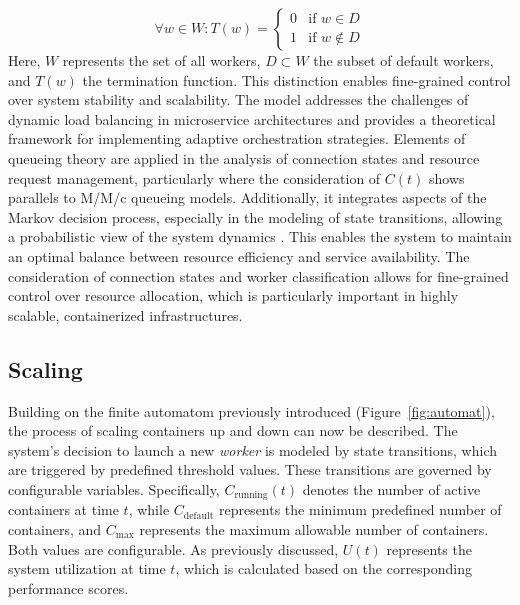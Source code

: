 \documentclass[twocolumn]{webofc}
\begin{document}
$$ \forall w \in W: T(w) = \begin{cases}
                               0 & \text{if } w \in D \\
                               1 & \text{if } w \notin D
\end{cases} $$
Here, $W$ represents the set of all workers, $D \subset W$ the subset of default workers, and $T(w)$ the termination function. This distinction enables fine-grained control over system stability and scalability. The model addresses the challenges of dynamic load balancing in microservice architectures and provides a theoretical framework for implementing adaptive orchestration strategies. Elements of queueing theory are applied in the analysis of connection states and resource request management, particularly where the consideration of $C(t)$ shows parallels to M/M/c queueing models. Additionally, it integrates aspects of the Markov decision process, especially in the modeling of state transitions, allowing a probabilistic view of the system dynamics \cite{kendall1953stochastic}. This enables the system to maintain an optimal balance between resource efficiency and service availability. The consideration of connection states and worker classification allows for fine-grained control over resource allocation, which is particularly important in highly scalable, containerized infrastructures.

\subsection{Scaling}
Building on the finite automatom previously introduced (Figure~\ref{fig:automat}), the process of scaling containers up and down can now be described. The system’s decision to launch a new \textit{worker} is modeled by state transitions, which are triggered by predefined threshold values. These transitions are governed by configurable variables. Specifically, \( C_{\text{running}}(t) \) denotes the number of active containers at time \( t \), while \( C_{\text{default}} \) represents the minimum predefined number of containers, and \( C_{\text{max}} \) represents the maximum allowable number of containers. Both values are configurable. As previously discussed, \( U(t) \) represents the system utilization at time \( t \), which is calculated based on the corresponding performance scores.
\end{document}
